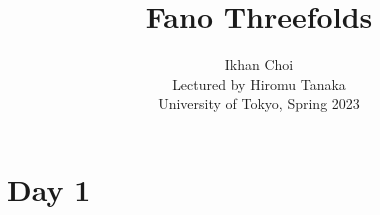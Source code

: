 \documentclass{../../small}
\begin{document}
\title{Fano Threefolds}
\author{Ikhan Choi\\Lectured by Hiromu Tanaka\\University of Tokyo, Spring 2023}
\maketitle
\tableofcontents

\newpage
\section{Day 1}
\end{document}
